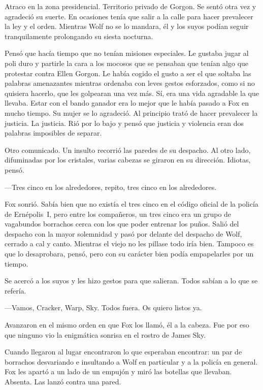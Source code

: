 Atraco en la zona presidencial. Territorio privado de Gorgon. Se sentó otra vez y agradeció su suerte. En ocasiones tenía que salir a la calle para hacer prevalecer la ley y el orden. Mientras Wolf no se lo mandara, él y los suyos podían seguir tranquilamente prolongando su siesta nocturna.

Pensó que hacía tiempo que no tenían misiones especiales. Le gustaba jugar al poli duro y partirle la cara a los mocosos que se pensaban que tenían algo que protestar contra Ellen Gorgon. Le había cogido el gusto a ser el que soltaba las palabras amenazantes mientras ordenaba con leves gestos esforzados, como si no quisiera hacerlo, que les golpearan una vez más. Sí, era una vida agradable la que llevaba. Estar con el bando ganador era lo mejor que le había pasado a Fox en mucho tiempo. Su mujer se lo agradeció. Al principio trató de hacer prevalecer la justicia. La justicia. Rió por lo bajo y pensó que justicia y violencia eran dos palabras imposibles de separar.

Otro comunicado. Un insulto recorrió las paredes de su despacho. Al otro lado, difuminadas por los cristales, varias cabezas se giraron en su dirección. Idiotas, pensó.

---Tres cinco en los alrededores, repito, tres cinco en los alrededores.

Fox sonrió. Sabía bien que no existía el tres cinco en el código oficial de la policía de Ernépolis~I, pero entre los compañeros, un tres cinco era un grupo de vagabundos borrachos cerca con los que poder entrenar los puños. Salió del despacho con la mayor solemnidad y pasó por delante del despacho de Wolf, cerrado a cal y canto. Mientras el viejo no les pillase todo iría bien. Tampoco es que lo desaprobara, pensó, pero con su carácter bien podía empapelarles por un tiempo.

Se acercó a los suyos y les hizo gestos para que salieran. Todos sabían a lo que se refería.

---Vamos, Cracker, Warp, Sky. Todos fuera. Os quiero listos ya.

Avanzaron en el mismo orden en que Fox los llamó, él a la cabeza. Fue por eso que ninguno vio la enigmática sonrisa en el rostro de James Sky.


Cuando llegaron al lugar encontraron lo que esperaban encontrar: un par de borrachos desvariando e insultando a Wolf en particular y a la policía en general. Fox les apartó a un lado de un empujón y miró las botellas que llevaban. Absenta. Las lanzó contra una pared.

